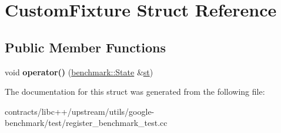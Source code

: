 \hypertarget{struct_custom_fixture}{}\section{Custom\+Fixture Struct Reference}
\label{struct_custom_fixture}
\subsection*{Public Member Functions}
\begin{DoxyCompactItemize}
\item 
\mbox{\label{struct_custom_fixture_afb5a3e86ed16e4767caeb2a699a6eddc}} 
void {\bfseries operator()} (\mbox{\hyperlink{classbenchmark_1_1_state}{benchmark\+::\+State}} \&\mbox{\hyperlink{structst}{st}})
\end{DoxyCompactItemize}


The documentation for this struct was generated from the following file\+:\begin{DoxyCompactItemize}
\item 
contracts/libc++/upstream/utils/google-\/benchmark/test/register\+\_\+benchmark\+\_\+test.\+cc\end{DoxyCompactItemize}
